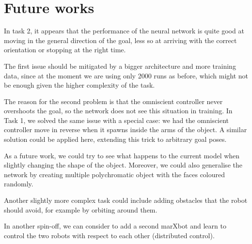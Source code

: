 \section{Future works}
In task 2, it appears that the performance of the neural network is quite good 
at moving in the general direction of the goal, less so at arriving with the 
correct orientation or stopping at the right time.

The first issue should be mitigated by a bigger architecture and more training 
data, since at the moment we are using only 2000 runs as before, which might 
not be enough given the higher complexity of the task.

The reason for the second problem is that the omniscient controller never 
overshoots the goal, so the network does not see this situation in training.
In Task 1, we solved the same issue with a special case: we had the omniscient 
controller move in reverse when it spawns inside the arms of the object. A 
similar solution could be applied here, extending this trick to arbitrary goal 
poses.

As a future work, we could try to see what happens to the current model when 
slightly changing the shape of the object. Moreover, we could also generalise 
the network by creating multiple polychromatic object with the faces coloured 
randomly. 

Another slightly more complex task could include adding obstacles that the 
robot should avoid, for example by orbiting around them.

In another spin-off, we can consider to add a second marXbot and learn to 
control the two robots with respect to each other (distributed control).
